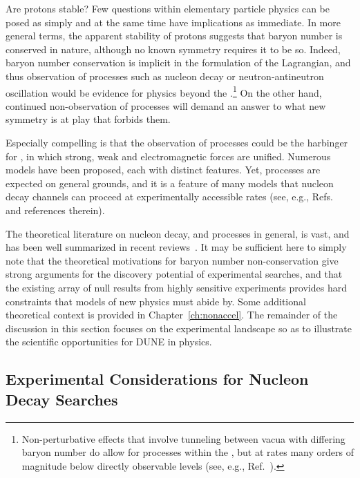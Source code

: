 Are protons stable?  Few questions within elementary 
particle physics can be posed as simply and at the same time 
have implications as immediate.  In more general terms, the 
apparent stability of protons suggests that baryon number 
is conserved in nature, although no known symmetry 
requires it to be so.  Indeed, baryon number conservation is 
implicit in the formulation of the  Lagrangian, and 
thus observation of  processes such 
as nucleon decay or neutron-antineutron oscillation 
would be evidence for physics beyond the .\footnote{Non-perturbative 
effects that involve tunneling between vacua with differing baryon number 
do allow for  processes within the , but at rates many orders of 
magnitude below directly observable levels (see, e.g., Ref.~\cite{Nath:2006ut}).}
On the other hand, continued non-observation of  processes will 
demand an answer to what new symmetry is at play that forbids 
them.
 
Especially compelling is that the observation of  processes 
could be the harbinger for , in which strong, weak and 
electromagnetic forces are unified.  Numerous  models 
have been proposed, each with distinct features.  Yet,  processes 
are expected on general grounds, and it is a feature of many models 
that nucleon decay channels can proceed at experimentally 
accessible rates (see, e.g., Refs.~\cite{Nath:2006ut,Babu:2013jba} 
and references therein).

The theoretical literature on nucleon decay, and  processes in general,  
is vast, and has been well summarized in recent 
reviews~\cite{Nath:2006ut,Babu:2013jba}.  
It may be sufficient here to simply note that the 
theoretical motivations for baryon number non-conservation give strong 
arguments for the discovery potential of experimental searches, 
and that the existing array of null results from highly sensitive experiments  
provides hard constraints that models of new physics must abide by.
Some additional theoretical context is provided in Chapter~\ref{ch:nonaccel}.
The remainder of the discussion in this section focuses on the experimental 
landscape so as to illustrate the scientific opportunities for DUNE in  physics.

\subsection{Experimental Considerations for Nucleon Decay Searches}
\label{subsec:landscape-ndk-expt}

